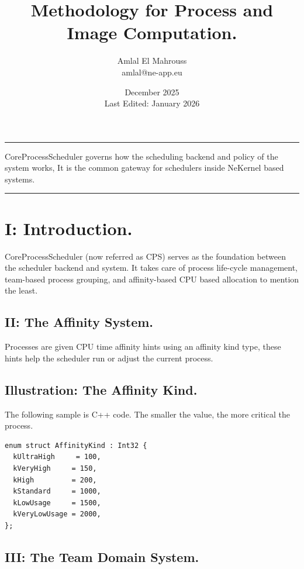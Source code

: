 \documentclass[11pt, a4paper]{article}
\title{Methodology for Process and Image Computation.}
\author{Amlal El Mahrouss\\amlal@ne-app.eu}
\date{December 2025\\Last Edited: January 2026}
\begin{document}
\bf \maketitle

\begin{center}
	\rule[0.01cm]{17cm}{0.01cm}
\end{center}

\abstract
{CoreProcessScheduler governs how the scheduling backend and policy of the system works, It is the common gateway for schedulers inside NeKernel based systems.}

\begin{center}
	\rule[1cm]{17cm}{0.01cm}
\end{center}

\section{I: Introduction.}

{CoreProcessScheduler (now referred as CPS) serves as the foundation between the scheduler backend and system.} {It takes care of process life-cycle management, team-based process grouping, and affinity-based CPU based allocation to mention the least.}

\subsection{II: The Affinity System.}

{Processes are given CPU time affinity hints using an affinity kind type, these hints help the scheduler run or adjust the current process.}

\subsection{Illustration: The Affinity Kind.}

{The following sample is C++ code.} {The smaller the value, the more critical the process.}

\begin{lstlisting}
enum struct AffinityKind : Int32 {
  kUltraHigh     = 100,
  kVeryHigh     = 150,
  kHigh         = 200,
  kStandard     = 1000,
  kLowUsage     = 1500,
  kVeryLowUsage = 2000,
};
\end{lstlisting}

\subsection{III: The Team Domain System.}
\end{document}
